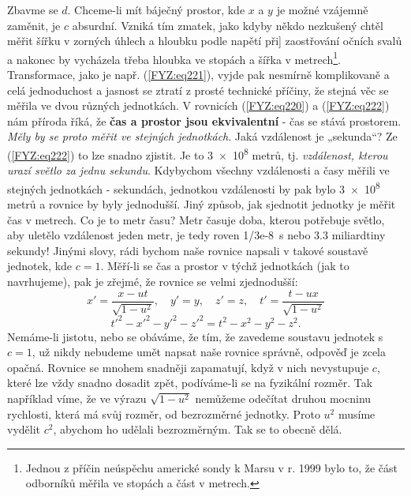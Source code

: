 {    Zbavme se \(d\). Chceme-li mít báječný prostor, kde \(x\) a \(y\) je možné vzájemně zaměnit, je 
    \(c\) absurdní. Vzniká tím zmatek, jako kdyby někdo nezkušený chtěl měřit šířku v zorných 
    úhlech a hloubku podle napětí při] zaostřování očních svalů a nakonec by vycházela třeba 
    hloubka ve stopách a šířka v metrech\footnote{Jednou z příčin neúspěchu americké sondy k Marsu 
    v r. \num{1999} bylo to, že část odborníků měřila ve stopách a část v metrech.}. Transformace, 
    jako je např. (\ref{FYZ:eq221}), vyjde pak nesmírně komplikovaně a celá jednoduchost a jasnost 
    se ztratí z prosté technické příčiny, že stejná věc se měřila ve dvou různých jednotkách. V 
    rovnicích (\ref{FYZ:eq220}) a (\ref{FYZ:eq222}) nám příroda říká, že \textbf{čas a prostor jsou 
    ekvivalentní} - čas se stává prostorem. \emph{Měly by se proto měřit ve stejných jednotkách}. 
    Jaká vzdálenost je „sekunda“? Ze (\ref{FYZ:eq222}) to lze snadno zjistit. Je to \num{3e8} 
    metrů, tj. \emph{vzdálenost, kterou urazí světlo za jednu sekundu}. Kdybychom všechny 
    vzdálenosti a časy měřili ve stejných jednotkách - sekundách, jednotkou vzdálenosti by pak bylo 
    \num{3e8} metrů a rovnice by byly jednodušší. Jiný způsob, jak sjednotit jednotky je měřit čas 
    v metrech. Co je to metr času? Metr časuje doba, kterou potřebuje světlo, aby uletělo 
    vzdálenost jeden metr, je tedy roven \SI{1/3e-8}{\s} nebo \num{3.3} miliardtiny sekundy! Jinými 
    slovy, rádi bychom naše rovnice napsali v takové soustavě jednotek, kde \(c = 1\). Měří-li se 
    čas a prostor v týchž jednotkách (jak to navrhujeme), pak je zřejmé, že rovnice se velmi 
    zjednodušší:
    \begin{equation}\label{FYZ:eq223}
      x' = \frac{x - ut}{\sqrt{1-u^2}},              \quad
      y' = y, \quad z' = z,                          \quad
      t' = \frac{t-ux}{\sqrt{1-u^2}} 
    \end{equation}
    \begin{equation}\label{FYZ:eq224}
      t'^2 - x'^2 - y'^2 - z'^2 = t^2 - x^2 - y^2 - z^2.
    \end{equation}
    Nemáme-li jistotu, nebo se obáváme, že tím, že zavedeme soustavu jednotek s \(c= 1\), už nikdy 
    nebudeme umět napsat naše rovnice správně, odpověď je zcela opačná. Rovnice se mnohem snadněji 
    zapamatují, když v nich nevystupuje \(c\), které lze vždy snadno dosadit zpět, podíváme-li se 
    na fyzikální rozměr. Tak například víme, že ve výrazu \(\sqrt{1 - u^2}\) nemůžeme odečítat 
    druhou mocninu rychlosti, která má svůj rozměr, od bezrozměrné jednotky. Proto \(u^2\) musíme 
    vydělit \(c^2\), abychom ho udělali bezrozměrným. Tak se to obecně dělá.
    
}
